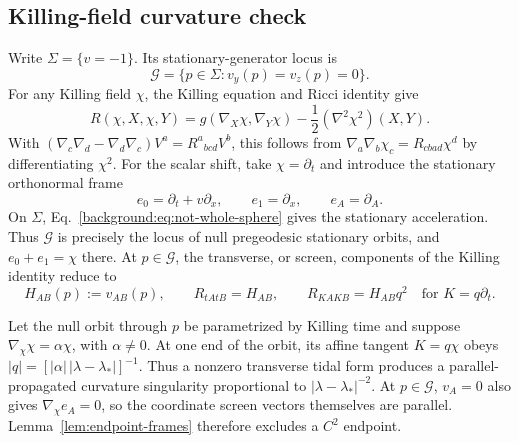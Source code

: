 \subsection*{Killing-field curvature check}
\label{background:app:local-curvature}

Write \(\Sigma=\{v=-1\}\).  Its stationary-generator locus is
\begin{equation}
  \mathcal G=\{p\in\Sigma:v_y(p)=v_z(p)=0\}.
  \label{background:eq:generator-locus}
\end{equation}
For any Killing field \(\chi\), the Killing equation and Ricci identity give
\begin{equation}
  R(\chi,X,\chi,Y)
   =g(\nabla_X\chi,\nabla_Y\chi)
    -\frac12(\nabla^2\chi^2)(X,Y).
  \label{background:eq:killing-tidal-identity}
\end{equation}
With
\((\nabla_c\nabla_d-\nabla_d\nabla_c)V^a=R^a{}_{bcd}V^b\), this follows from
\(\nabla_a\nabla_b\chi_c=R_{cbad}\chi^d\) by differentiating \(\chi^2\).
For the scalar shift, take \(\chi=\partial_t\) and introduce the stationary
orthonormal frame
\begin{equation}
  e_0=\partial_t+v\partial_x,\qquad e_1=\partial_x,
  \qquad e_A=\partial_A.
  \label{background:eq:stationary-frame}
\end{equation}
On \(\Sigma\), Eq.~\eqref{background:eq:not-whole-sphere} gives the stationary acceleration.
Thus \(\mathcal G\) is precisely the locus of null pregeodesic stationary
orbits, and \(e_0+e_1=\chi\) there.  At \(p\in\mathcal G\), the transverse,
or screen, components of the Killing identity reduce to
\begin{equation}
  H_{AB}(p):=v_{AB}(p),
  \qquad
  R_{tAtB}=H_{AB},
  \qquad R_{KAKB}=H_{AB}q^2
  \quad\text{for }K=q\partial_t .
  \label{background:eq:screen-general}
\end{equation}

Let the null orbit through \(p\) be parametrized by Killing time and suppose
\(\nabla_\chi\chi=\alpha\chi\), with \(\alpha\ne0\).  At one end of the orbit,
its affine tangent \(K=q\chi\) obeys
\(|q|=[|\alpha|\,|\lambda-\lambda_*|]^{-1}\).  Thus a nonzero transverse tidal
form produces a parallel-propagated curvature singularity proportional to
\(|\lambda-\lambda_*|^{-2}\).  At \(p\in\mathcal G\), \(v_A=0\) also gives
\(\nabla_\chi e_A=0\), so the coordinate screen vectors themselves are parallel.
Lemma~\ref{lem:endpoint-frames} therefore excludes a \(C^2\) endpoint.

